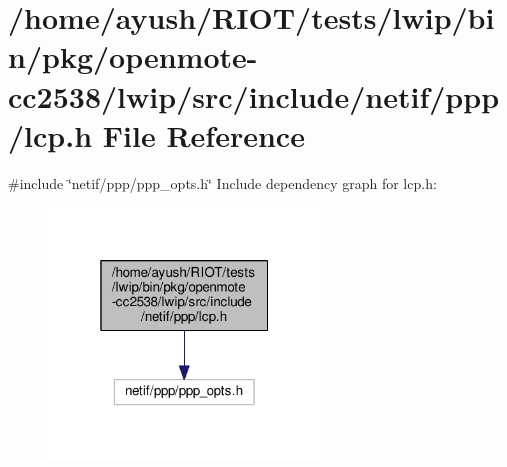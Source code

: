 \hypertarget{openmote-cc2538_2lwip_2src_2include_2netif_2ppp_2lcp_8h}{}\section{/home/ayush/\+R\+I\+O\+T/tests/lwip/bin/pkg/openmote-\/cc2538/lwip/src/include/netif/ppp/lcp.h File Reference}
\label{openmote-cc2538_2lwip_2src_2include_2netif_2ppp_2lcp_8h}
{\ttfamily \#include \char`\"{}netif/ppp/ppp\+\_\+opts.\+h\char`\"{}}\newline
Include dependency graph for lcp.\+h\+:
\nopagebreak
\begin{figure}[H]
\begin{center}
\leavevmode
\includegraphics[width=205pt]{openmote-cc2538_2lwip_2src_2include_2netif_2ppp_2lcp_8h__incl}
\end{center}
\end{figure}
